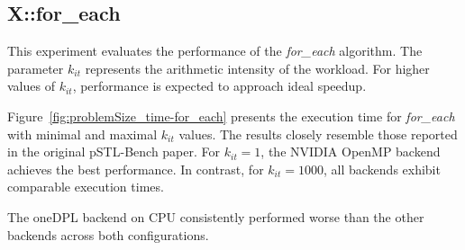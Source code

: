\documentclass[sigconf]{acmart}
\begin{document}
\subsection{X::for\_each}

This experiment evaluates the performance of the \textit{for\_each} algorithm.
The parameter $k_{it}$ represents the arithmetic intensity of the workload. For
higher values of $k_{it}$, performance is expected to approach ideal speedup.

Figure~\ref{fig:problemSize_time-for_each} presents the execution time for
\textit{for\_each} with minimal and maximal $k_{it}$ values. The results
closely resemble those reported in the original pSTL-Bench paper. For $k_{it} =
      1$, the NVIDIA OpenMP backend achieves the best performance. In contrast, for
$k_{it} = 1000$, all backends exhibit comparable execution times.

The oneDPL backend on CPU consistently performed worse than the other backends
across both configurations.
\end{document}
